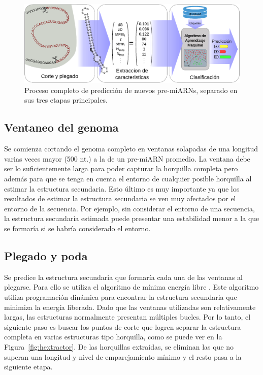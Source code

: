 \begin{figure}[h]
	\centering
	\includegraphics[width=\textwidth]{fig/diagrama.eps}
	\caption[Etapas de la predicción de microARN]{Proceso completo de predicción de nuevos pre-miARNs, separado en sus tres etapas principales.}
	\label{fig:esquema}
\end{figure}

\subsection{Ventaneo del genoma}

Se comienza cortando el genoma completo en ventanas solapadas de una longitud varias veces mayor (500 nt.) a la de un pre-miARN promedio. La ventana debe ser
lo suficientemente larga para poder capturar la horquilla completa pero además para que se tenga en cuenta el entorno de cualquier posible horquilla al
estimar la estructura secundaria. Esto último es muy importante ya que los resultados de estimar la estructura secundaria se ven muy afectados por el entorno
de la secuencia. Por ejemplo, sin considerar el entorno de una secuencia, la estructura secundaria estimada puede presentar una estabilidad menor a la que se
formaría si se habría considerado el entorno.

\subsection{Plegado y poda}

Se predice la estructura secundaria que formaría cada una de las ventanas al plegarse. Para ello se utiliza el algoritmo de mínima energía libre
\citep{zuker1981optimal}. Este algoritmo utiliza programación dinámica para encontrar la estructura secundaria que minimiza la energía liberada. Dado que
las ventanas utilizadas son relativamente largas, las estructuras normalmente presentan múltiples bucles. Por lo tanto, el siguiente paso es buscar los puntos
de corte que logren separar la estructura completa en varias estructuras tipo horquilla, como se puede ver en la Figura~\ref{fig:hextractor}. De las horquillas
extraídas, se eliminan las que no superan una longitud y nivel de emparejamiento mínimo y el resto pasa a la siguiente etapa.

